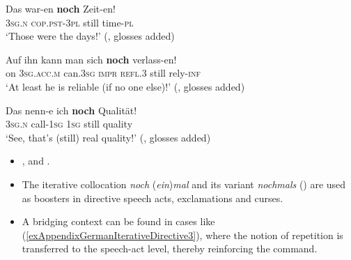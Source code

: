 \begin{exe}

	\ex\label{exAppendixGermanNochZeiten1}
	\gll Das war-en \textbf{noch} Zeit-en!\\
	3\textsc{sg}.\textsc{n} \textsc{cop}.\textsc{pst}-3\textsc{pl} still time-\textsc{pl}\\
	\glt \lq Those were the days!\rq{ }(\cite[633]{MetrichFaucher2009}, glosses added)
	
\ex\label{exAppendixGermanNochZeiten2}
		\gll Auf ihn kann man sich \textbf{noch} verlass-en!\\
	on 3\textsc{sg}.\textsc{acc}.\textsc{m} can.3\textsc{sg} \textsc{impr} \textsc{refl}.3 still rely-\textsc{inf}\\
	\glt \lq At least he is reliable (if no one else)!\rq{ }(\cite[633]{MetrichFaucher2009}, glosses added)
	
\ex\label{exAppendixGermanNochZeiten3}
	\gll Das nenn-e ich \textbf{noch} Qualität!\\
	3\textsc{sg}.\textsc{n} call-1\textsc{sg} 1\textsc{sg} still quality\\
	\glt \lq See, that's (still) real quality!\rq{ }(\cite[633]{MetrichFaucher2009}, glosses added)
\end{exe}

\label{appendixGermanIterativeDirectives}
\begin{itemize}
	\item \textcite[s.v. \textit{noch}]{DWDS}, \textcite[s.v. \textit{nochmal}, \textit{nochmals}, \textit{noch einmal}]{Duden} and \textcite[627–628]{MetrichFaucher2009}.
	\item The iterative collocation \textit{noch} (\textit{ein})\textit{mal} and its variant \textit{nochmals} () are used as boosters in directive speech acts, exclamations and curses.
	 \item A bridging context can be found in cases like (\ref{exAppendixGermanIterativeDirective3}), where the notion of repetition is transferred to the speech-act level, thereby reinforcing the command.
\end{itemize}


